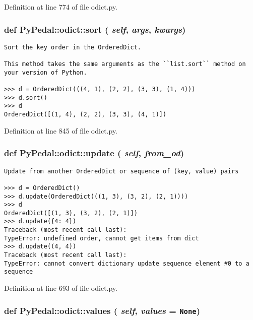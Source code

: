 Definition at line 774 of file odict.py.\hypertarget{namespacePyPedal_1_1odict_76a7a596f351e3891886c45ebb5ed7f8}{
\subsubsection{\setlength{\rightskip}{0pt plus 5cm}def PyPedal::odict::sort ( {\em self},  {\em args},  {\em kwargs})}}
\label{namespacePyPedal_1_1odict_76a7a596f351e3891886c45ebb5ed7f8}




\footnotesize\begin{verbatim}
Sort the key order in the OrderedDict.

This method takes the same arguments as the ``list.sort`` method on
your version of Python.

>>> d = OrderedDict(((4, 1), (2, 2), (3, 3), (1, 4)))
>>> d.sort()
>>> d
OrderedDict([(1, 4), (2, 2), (3, 3), (4, 1)])
\end{verbatim}
\normalsize
 

Definition at line 845 of file odict.py.\hypertarget{namespacePyPedal_1_1odict_5e34a1ab03632eddbbb9417b13624a4d}{
\subsubsection{\setlength{\rightskip}{0pt plus 5cm}def PyPedal::odict::update ( {\em self},  {\em from\_\-od})}}
\label{namespacePyPedal_1_1odict_5e34a1ab03632eddbbb9417b13624a4d}




\footnotesize\begin{verbatim}
Update from another OrderedDict or sequence of (key, value) pairs

>>> d = OrderedDict()
>>> d.update(OrderedDict(((1, 3), (3, 2), (2, 1))))
>>> d
OrderedDict([(1, 3), (3, 2), (2, 1)])
>>> d.update({4: 4})
Traceback (most recent call last):
TypeError: undefined order, cannot get items from dict
>>> d.update((4, 4))
Traceback (most recent call last):
TypeError: cannot convert dictionary update sequence element #0 to a sequence
\end{verbatim}
\normalsize
 

Definition at line 693 of file odict.py.\hypertarget{namespacePyPedal_1_1odict_87c8f6a804b58bc4dff15b55fe1fa4b4}{
\subsubsection{\setlength{\rightskip}{0pt plus 5cm}def PyPedal::odict::values ( {\em self},  {\em values} = {\tt None})}}
\label{namespacePyPedal_1_1odict_87c8f6a804b58bc4dff15b55fe1fa4b4}




